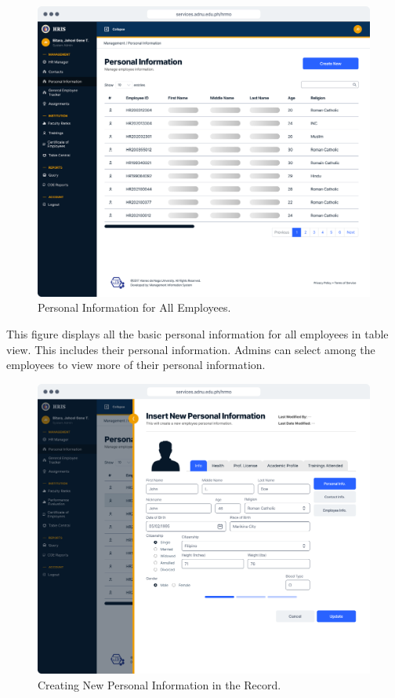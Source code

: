     \begin{figure}[H]
        \centering
        \includegraphics[width=1\linewidth]{figures/app/pi.png}
        \caption{Personal Information for All Employees.}
        \label{fig:app-pi}
    \end{figure}

    This figure displays all the basic personal information for all employees in table view. This includes their personal information. Admins can select among the employees to view more of their personal information.

    \begin{figure}[H]
        \centering
        \includegraphics[width=1\linewidth]{figures/app/pi-insert.png}
        \caption{Creating New Personal Information in the Record.}
        \label{fig:app-pi-insert}
    \end{figure}

